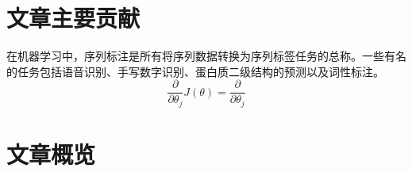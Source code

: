 \section{文章主要贡献}
在机器学习中，序列标注是所有将序列数据转换为序列标签任务的总称。一些有名的任务包括语音识别、手写数字识别、蛋白质二级结构的预测以及词性标注。
\begin{equation}
\frac{\partial}{\partial \theta_j} J (\theta) = \frac{\partial}{\partial \theta_j}
\end{equation}
\section{文章概览}